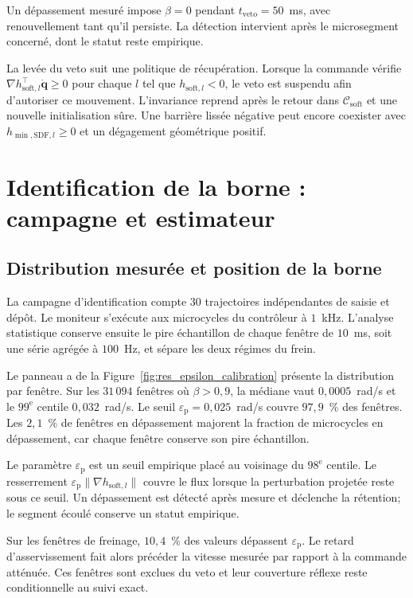 Un dépassement mesuré impose $\beta=0$ pendant $t_{\mathrm{veto}}=50$~ms, avec renouvellement tant qu'il persiste. La détection intervient après le microsegment concerné, dont le statut reste empirique.

La levée du veto suit une politique de récupération. Lorsque la commande vérifie $\nabla h_{\mathrm{soft},l}^{\top}\dot{\mathbf q}\geq0$ pour chaque $l$ tel que $h_{\mathrm{soft},l}<0$, le veto est suspendu afin d'autoriser ce mouvement. L'invariance reprend après le retour dans $\mathcal C_{\mathrm{soft}}$ et une nouvelle initialisation sûre. Une barrière lissée négative peut encore coexister avec $h_{\min,\mathrm{SDF},l}\geq0$ et un dégagement géométrique positif.

\section*{Identification de la borne : campagne et estimateur}

\subsection*{Distribution mesurée et position de la borne}

La campagne d'identification compte $30$ trajectoires indépendantes de saisie et dépôt. Le moniteur s'exécute aux microcycles du contrôleur à $1$~kHz. L'analyse statistique conserve ensuite le pire échantillon de chaque fenêtre de $10$~ms, soit une série agrégée à $100$~Hz, et sépare les deux régimes du frein.

Le panneau a de la Figure~\ref{fig:res_epsilon_calibration} présente la distribution par fenêtre. Sur les $31\,094$ fenêtres où $\beta>0{,}9$, la médiane vaut $0{,}0005$~rad/s et le $99^{\text{e}}$ centile $0{,}032$~rad/s. Le seuil $\varepsilon_{\mathrm p}=0{,}025$~rad/s couvre $97{,}9$~\% des fenêtres. Les $2{,}1$~\% de fenêtres en dépassement majorent la fraction de microcycles en dépassement, car chaque fenêtre conserve son pire échantillon.

Le paramètre $\varepsilon_{\mathrm p}$ est un seuil empirique placé au voisinage du $98^{\text{e}}$ centile. Le resserrement $\varepsilon_{\mathrm p}\|\nabla h_{\mathrm{soft},l}\|$ couvre le flux lorsque la perturbation projetée reste sous ce seuil. Un dépassement est détecté après mesure et déclenche la rétention; le segment écoulé conserve un statut empirique.

Sur les fenêtres de freinage, $10{,}4$~\% des valeurs dépassent $\varepsilon_{\mathrm p}$. Le retard d'asservissement fait alors précéder la vitesse mesurée par rapport à la commande atténuée. Ces fenêtres sont exclues du veto et leur couverture réflexe reste conditionnelle au suivi exact.

